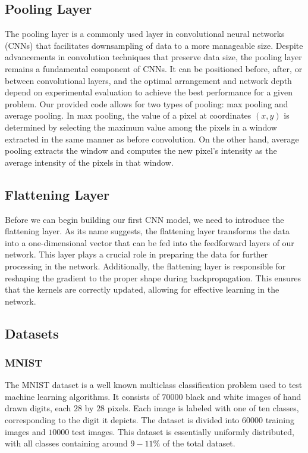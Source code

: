 \documentclass[onecolumn,10pt,cleanfoot]{asme2ej}
\begin{document}
\subsection{Pooling Layer}
The pooling layer is a commonly used layer in convolutional neural networks (CNNs) that facilitates downsampling of data to a more manageable size. Despite advancements in convolution techniques that preserve data size, the pooling layer remains a fundamental component of CNNs. It can be positioned before, after, or between convolutional layers, and the optimal arrangement and network depth depend on experimental evaluation to achieve the best performance for a given problem. Our provided code allows for two types of pooling: max pooling and average pooling. In max pooling, the value of a pixel at coordinates $(x,y)$ is determined by selecting the maximum value among the pixels in a window extracted in the same manner as before convolution. On the other hand, average pooling extracts the window and computes the new pixel's intensity as the average intensity of the pixels in that window.

\subsection{Flattening Layer}
Before we can begin building our first CNN model, we need to introduce the flattening layer. As its name suggests, the flattening layer transforms the data into a one-dimensional vector that can be fed into the feedforward layers of our network. This layer plays a crucial role in preparing the data for further processing in the network. Additionally, the flattening layer is responsible for reshaping the gradient to the proper shape during backpropagation. This ensures that the kernels are correctly updated, allowing for effective learning in the network.

\subsection{Datasets} 

\subsubsection{MNIST}
The MNIST dataset is a well known multiclass classification problem used to test machine learning algorithms. It consists of $70000$ black and white images of hand drawn digits, each $28$ by $28$ pixels. Each image is labeled with one of ten classes, corresponding to the digit it depicts. The dataset is divided into $60000$ training images and $10000$ test images. This dataset is essentially uniformly distributed, with all classes containing around $9 - 11\%$ of the total dataset.
\end{document}
